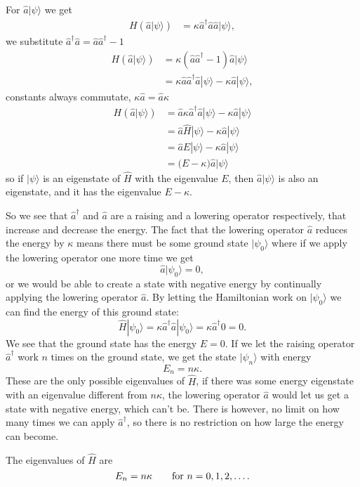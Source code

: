 \documentclass[a4paper, 11pt, titlepage, english]{article}
\newcommand{\ket}[1]{|#1 \rangle}
\newcommand{\op}[1]{\hat{#1}}
\begin{document}
For $\op{a}\ket{\psi}$ we get
\begin{align*}
{H}\left(\op{a}\ket{\psi}\right) &= \kappa\op{a}^\dag\op{a}\op{a}\ket{\psi},
\end{align*}
we substitute $\op{a}^\dag\op{a} = \op{a}\op{a}^\dag - 1$
\begin{align*}
{H}\left(\op{a}\ket{\psi}\right) &= \kappa\left(\op{a}\op{a}^\dag -1 \right)\op{a}\ket{\psi} \\
&= \kappa\op{a}\op{a}^\dag\op{a}\ket{\psi} - \kappa\op{a}\ket{\psi}, 
\end{align*}
constants always commutate, $\kappa \op{a} = \op{a}\kappa$
\begin{align*}
{H}\left(\op{a}\ket{\psi}\right) &= \op{a}\kappa\op{a}^\dag\op{a}\ket{\psi} - \kappa\op{a}\ket{\psi} \\
&= \op{a}\op{H}\ket{\psi} - \kappa\op{a}\ket{\psi} \\
&= \op{a}E\ket{\psi} - \kappa\op{a}\ket{\psi} \\
&= \Bigg(E - \kappa\Bigg)\op{a}\ket{\psi}
\end{align*}
so if $\ket{\psi}$ is an eigenstate of $\op{H}$ with the eigenvalue $E$, then $\op{a}\ket{\psi}$ is also an eigenstate, and it has the eigenvalue $E-\kappa$.

So we see that $\op{a}^\dag$ and $\op{a}$ are a raising and a lowering operator respectively, that increase and decrease the energy. The fact that the lowering operator $\op{a}$ reduces the energy by $\kappa$ means there must be some ground state $\ket{\psi_0}$ where if we apply the lowering operator one more time we get
$$\op{a}\ket{\psi_0} = 0,$$
or we would be able to create a state with negative energy by continually applying the lowering operator $\op{a}$. By letting the Hamiltonian work on $\ket{\psi_0}$ we can find the energy of this ground state:
$$\op{H}\ket{\psi_0} = \kappa\op{a}^\dag\op{a}\ket{\psi_0} = \kappa \op{a}^\dag 0 = 0.$$
We see that the ground state has the energy $E=0$. If we let the raising operator $\op{a}^\dag$ work $n$ times on the ground state, we get the state $\ket{\psi_n}$ with energy
$$E_n = n\kappa.$$
These are the only possible eigenvalues of $\op{H}$, if there was some energy eigenstate with an eigenvalue different from $n\kappa$, the lowering operator $\op{a}$ would let us get a state with negative energy, which can't be. There is however, no limit on how many times we can apply $\op{a}^\dag$, so there is no restriction on how large the energy can become.

The eigenvalues of $\op{H}$ are
$$E_n = n\kappa \qquad {\rm for\ }n = 0, 1, 2, \ldots.$$
\end{document}
